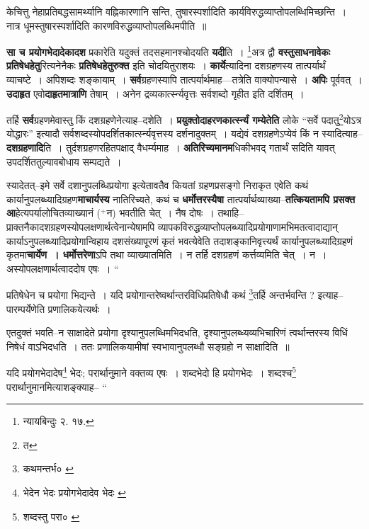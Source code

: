 \documentclass[article,12pt,a4paper]{memoir}
\newcommand{\add}[1]{($^{+}$#1)}
\begin{document}
	  \endgroup
	

	  \pstart केचित्तु नेहाप्रतिबद्धसामर्थ्यानि वह्निकारणानि सन्ति, तुषारस्पर्शादिति कार्यविरुद्धव्याप्तोपलब्धिमिच्छन्ति । नात्र धूमस्तुषारस्पर्शादिति कारणविरुद्धव्याप्तोपलब्धिमपीति ॥
	\pend
      

	  \pstart \textbf{सा च प्रयोगभेदादेकादश} प्रकारेति यदुक्तं तदसहमानश्चोदयति \textbf{यदी}ति । \footnote{न्यायबिन्दुः २. १७.}अत्र द्वौ \textbf{वस्तुसाधनावेकः प्रतिषेधहेतु}रित्यनेनैकः \textbf{प्रतिषेधहेतुरुक्त} इति चोदयितुराशयः । \textbf{कार्ये}त्यादिना दशग्रहणस्य तात्पर्यार्थं व्याचष्टे । अपिशब्दः शङ्कायाम् । \textbf{सर्व}ग्रहणस्यापि तात्पर्यार्थमाह—तत्रेति वाक्योपन्यासे । \textbf{अपिः} पूर्ववत् । \textbf{उदाहृत} एवो\textbf{दाहृतमात्राणि} तेषाम् । अनेन द्रव्यकार्त्स्न्यवृत्तः सर्वशब्दो गृहीत इति दर्शितम् ।
	\pend
      

	  \pstart तर्हि \leavevmode{} \textbf{सर्व}ग्रहणमेवास्तु किं दशग्रहणेनेत्याह--दशेति । \textbf{प्रयुक्तोदाहरणकार्त्स्न्यं गम्येतेति} लोके “सर्वे पदातु\footnote{त}योऽत्र योद्धारः” इत्यादौ सर्वशब्दस्योपदर्शितकार्त्स्न्यवृत्तस्य दर्शनादुक्तम् । यद्येवं दशग्रहणेऽप्येवं किं न स्यादित्याह--\textbf{दशग्रहणादि}ति । तुर्दशग्रहणरहितपक्षाद् वैधर्म्यमाह । \textbf{अतिरिच्यमानम}धिकीभवद् गतार्थं सदिति यावत् उपदर्शिततुल्यावबोधाय सम्पद्यते ।
	\pend
      

	  \pstart स्यादेतत्--इमे सर्वे दशानुपलब्धिप्रयोगा इत्येतावतैव कियतां ग्रहणप्रसङ्गो निराकृत एवेति कथं कार्यानुपलब्ध्यादिग्रहण\textbf{माचार्यस्य} नातिरिच्यते, कथं च \textbf{धर्मोत्तरस्यैषा} तात्पर्यार्थव्याख्या--\textbf{तत्कियतामपि प्रसक्त आ}हेत्यपर्यालोचितव्याख्यानं \add{न} भवतीति चेत् । नैष दोषः । तथाहि--प्राक्तनैकादशग्रहणस्योपलक्षणार्थत्वेनान्येषामपि व्यापकविरुद्धव्याप्तोपलब्ध्यादिप्रयोगाणामभिमतत्वादाद्यान् कार्याऽनुपलब्ध्यादिप्रयोगान्विहाय दशसंख्यापूरणं कृतं भवत्येवेति तदाशङ्कानिवृत्त्यर्थं कार्यानुपलब्ध्यादिग्रहणं कृतमा\textbf{चार्येण । धर्मोत्तरेणा}ऽपि तथा व्याख्यातमिति । न तर्हि दशग्रहणं कर्त्तव्यमिति चेत् । न । अस्योपलक्षणार्थत्वाददोष एषः ।  \leavevmode{} “
	  
	प्रतिषेधेन च प्रयोगा भिद्यन्ते । यदि प्रयोगान्तरेष्वर्थान्तरविधिप्रतिषेधौ कथं \footnote{कथमन्तर्भ० \cite{dp-msC}}तर्हि अन्तर्भवन्ति ? इत्याह--पारम्पर्येणेति प्रणालिकयेत्यर्थः । 
	  
	एतदुक्तं भवति--न साक्षादेते प्रयोगा दृश्यानुपलब्धिमभिदधति, दृश्यानुपलब्ध्यव्यभिचारिणं त्वर्थान्तरस्य विधिं निषेधं वाऽभिदधति । ततः प्रणालिकयामीषां स्वभावानुपलब्धौ सङ्ग्रहो न साक्षादिति ॥ 
	  
	यदि प्रयोगभेदादेष\footnote{भेदेन भेदः \cite{dp-msA} \cite{dp-edP} \cite{dp-edH} \cite{dp-edE} \cite{dp-edN} प्रयोगभेदादेव भेदः \cite{dp-msB} \cite{dp-msC}} भेदः; परार्थानुमाने वक्तव्य एषः । शब्दभेदो हि प्रयोगभेदः । शब्दश्च\footnote{शब्दस्तु परा० \cite{dp-msB} \cite{dp-msC}} परार्थानुमानमित्याशङ्क्याह-- “
	  
\end{document}
